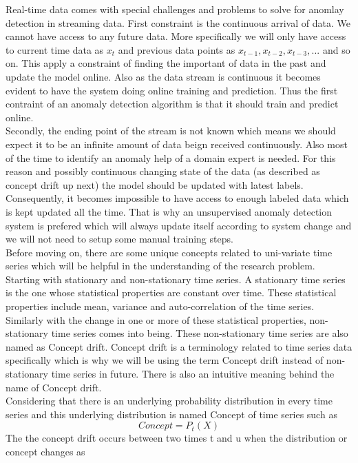 \documentclass[12pt]{article}
\begin{document}
Real-time data comes with special challenges and problems to solve for anomlay detection in streaming data. First constraint is the continuous arrival of data. 
We cannot have access to any future data. More specifically we will only have access to current time data as $x_t$ and previous data points as $x_{t-1},x_{t-2},x_{t-3},...$ and so on. This apply a constraint of finding the important of data in the past and update the model online. Also as the data stream is continuous it becomes evident to have the system doing online training and prediction. Thus the first contraint of an anomaly detection algorithm is that it should train and predict online.\\
\break
Secondly, the ending point of the stream is not known which means we should expect it to be an infinite amount of data beign received continuously. Also most of the time to identify an anomaly help of a domain expert is needed. For this reason and possibly continuous changing state of the data (as described as concept drift up next) the model should be updated with latest labels. Consequently, it becomes impossible to have access to enough labeled data which is kept updated all the time. That is why an unsupervised anomaly detection system is prefered which will always update itself according to system change and we will not need to setup some manual training steps.\\
\break
Before moving on, there are some unique concepts related to uni-variate time series which will be helpful in the understanding of the research problem. Starting with stationary and non-stationary time series. A stationary time series is the one whose statistical properties are constant over time. These statistical properties include mean, variance and auto-correlation of the time series. Similarly with the change in one or more of these statistical properties, non-stationary time series comes into being. These non-stationary time series are also named as Concept drift. Concept drift is a terminology related to time series data specifically which is why we will be using the term Concept drift instead of non-stationary time series in future. There is also an intuitive meaning behind the name of Concept drift.\\
\break
Considering that there is an underlying probability distribution in every time series and this underlying distribution is named Concept of time series such as
\begin{equation}
Concept =  P_t(X)
\end{equation} 
The the concept drift occurs between two times t and u when the distribution or concept changes as
\end{document}
